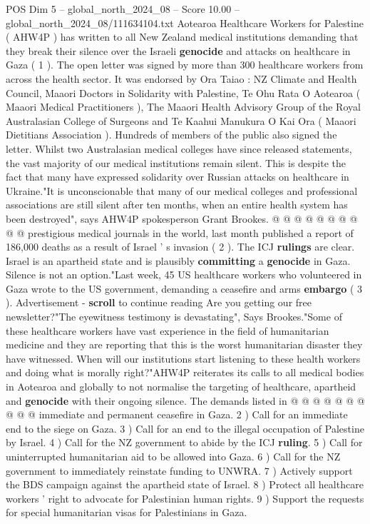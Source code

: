 \begin{textsample}{POS Dim 5 – global\_north\_2024\_08 – Score 10.00 – global\_north\_2024\_08/111634104.txt}  \label{ex:f5_pos_380}
Aotearoa Healthcare Workers for Palestine ( AHW4P ) has written to all New Zealand medical institutions demanding that they break their silence over the Israeli \textbf{genocide} and attacks on healthcare in Gaza ( 1 ).
The open letter was signed by more than 300 healthcare workers from across the health sector.
It was endorsed by Ora Taiao : NZ Climate and Health Council, Maaori Doctors in Solidarity with Palestine, Te Ohu Rata O Aotearoa ( Maaori Medical Practitioners ), The Maaori Health Advisory Group of the Royal Australasian College of Surgeons and Te Kaahui Manukura O Kai Ora ( Maaori Dietitians Association ).
Hundreds of members of the public also signed the letter.
Whilst two Australasian medical colleges have since released statements, the vast majority of our medical institutions remain silent.
This is despite the fact that many have expressed solidarity over Russian attacks on healthcare in Ukraine."It is unconscionable that many of our medical colleges and professional associations are still silent after ten months, when an entire health system has been destroyed", says AHW4P spokesperson Grant Brookes. @ @ @ @ @ @ @ @ @ @ prestigious medical journals in the world, last month published a report of 186,000 deaths as a result of Israel ' s invasion ( 2 ).
The ICJ \textbf{rulings} are clear.
Israel is an apartheid state and is plausibly \textbf{committing} a \textbf{genocide} in Gaza.
Silence is not an option."Last week, 45 US healthcare workers who volunteered in Gaza wrote to the US government, demanding a ceasefire and arms \textbf{embargo} ( 3 ).
Advertisement - \textbf{scroll} to continue reading Are you getting our free newsletter?"The eyewitness testimony is devastating", Says Brookes."Some of these healthcare workers have vast experience in the field of humanitarian medicine and they are reporting that this is the worst humanitarian disaster they have witnessed.
When will our institutions start listening to these health workers and doing what is morally right?"AHW4P reiterates its calls to all medical bodies in Aotearoa and globally to not normalise the targeting of healthcare, apartheid and \textbf{genocide} with their ongoing silence.
The demands listed in @ @ @ @ @ @ @ @ @ @ immediate and permanent ceasefire in Gaza. 2 ) Call for an immediate end to the siege on Gaza. 3 ) Call for an end to the illegal occupation of Palestine by Israel. 4 ) Call for the NZ government to abide by the ICJ \textbf{ruling}. 5 ) Call for uninterrupted humanitarian aid to be allowed into Gaza. 6 ) Call for the NZ government to immediately reinstate funding to UNWRA. 7 ) Actively support the BDS campaign against the apartheid state of Israel. 8 ) Protect all healthcare workers ' right to advocate for Palestinian human rights. 9 ) Support the requests for special humanitarian visas for Palestinians in Gaza.

\end{textsample}

